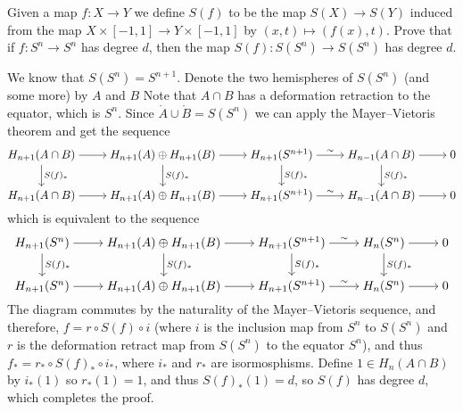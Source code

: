 \documentclass[11pt,a4paper]{article}
\begin{document}
\begin{exercise}
  \label{ex:three-one}
  Given a map $f \colon X \to Y$ we define $S(f)$ to be the map
  $S(X) \to S(Y)$ induced from the map $X \times [-1,1] \to Y \times [-1,1]$
  by $(x,t) \mapsto (f(x),t)$.
  Prove that if $f \colon S^n \to S^n$ has degree $d$,
  then the map $S(f) \colon S(S^n) \to S(S^n)$ has degree $d$.
\end{exercise}
\begin{solution}
  We know that $S(S^n) = S^{n+1}$.
  Denote the two hemispheres of $S(S^n)$ (and some more) by $A$
  and $B$
  Note that $A \cap B$ has a deformation retraction to the equator,
  which is $S^{n}$.
  Since $\mathring A \cup \mathring B = S(S^n)$ we can apply the Mayer--Vietoris
  theorem and get the sequence
  \[\begin{tikzcd}[ampersand replacement=\&,cramped]
    {H_{n+1}(A \cap B)} \& {H_{n+1}(A) \oplus H_{n+1}(B)} \& {H_{n+1}(S^{n+1})} \& {H_{n-1}(A \cap B)} \& 0 \\
    {H_{n+1}(A \cap B)} \& {H_{n+1}(A) \oplus H_{n+1}(B)} \& {H_{n+1}(S^{n+1})} \& {H_{n-1}(A \cap B)} \& 0
    \arrow[from=1-1, to=1-2]
    \arrow["{S(f)_*}", from=1-1, to=2-1]
    \arrow[from=1-2, to=1-3]
    \arrow["{S(f)_*}", from=1-2, to=2-2]
    \arrow["\sim", from=1-3, to=1-4]
    \arrow["{S(f)_*}", from=1-3, to=2-3]
    \arrow[from=1-4, to=1-5]
    \arrow["{S(f)_*}", from=1-4, to=2-4]
    \arrow[from=2-1, to=2-2]
    \arrow[from=2-2, to=2-3]
    \arrow["\sim", from=2-3, to=2-4]
    \arrow[from=2-4, to=2-5]
  \end{tikzcd}\]
  which is equivalent to the sequence
  \[\begin{tikzcd}[ampersand replacement=\&,cramped]
    {H_{n+1}(S^n)} \& {H_{n+1}(A) \oplus H_{n+1}(B)} \& {H_{n+1}(S^{n+1})} \& {H_{n}(S^n)} \& 0 \\
    {H_{n+1}(S^n)} \& {H_{n+1}(A) \oplus H_{n+1}(B)} \& {H_{n+1}(S^{n+1})} \& {H_{n}(S^n)} \& 0
    \arrow[from=1-1, to=1-2]
    \arrow["{S(f)_*}", from=1-1, to=2-1]
    \arrow[from=1-2, to=1-3]
    \arrow["{S(f)_*}", from=1-2, to=2-2]
    \arrow["\sim", from=1-3, to=1-4]
    \arrow["{S(f)_*}", from=1-3, to=2-3]
    \arrow[from=1-4, to=1-5]
    \arrow["{S(f)_*}", from=1-4, to=2-4]
    \arrow[from=2-1, to=2-2]
    \arrow[from=2-2, to=2-3]
    \arrow["\sim", from=2-3, to=2-4]
    \arrow[from=2-4, to=2-5]
  \end{tikzcd}\]
  The diagram commutes by the naturality of the Mayer--Vietoris sequence,
  and therefore,
  $f = r \circ S(f) \circ i$ (where $i$ is the inclusion map
  from $S^n$ to $S(S^n)$ and $r$ is the deformation retract map from
  $S(S^n)$ to the equator $S^n$), and thus $f_* = r_* \circ S(f)_* \circ i_*$,
  where $i_*$ and $r_*$ are isormosphisms.
  Define $1 \in H_n(A \cap B)$ by $i_*(1)$ so
  $r_*(1) = 1$, and thus $S(f)_*(1) = d$,
  so $S(f)$ has degree $d$, which completes the proof.
\end{solution}
\end{document}
